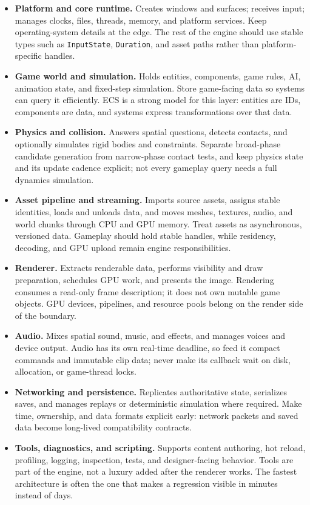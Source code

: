 \documentclass[
  11pt,
  letterpaper,
  DIV=11,
  numbers=noendperiod,
  twoside,
  open=right]{scrreprt}
\begin{document}
\begin{itemize}
\item
  \textbf{Platform and core runtime.} Creates windows and surfaces;
  receives input; manages clocks, files, threads, memory, and platform
  services. Keep operating-system details at the edge. The rest of the
  engine should use stable types such as \texttt{InputState},
  \texttt{Duration}, and asset paths rather than platform-specific
  handles.
\item
  \textbf{Game world and simulation.} Holds entities, components, game
  rules, AI, animation state, and fixed-step simulation. Store
  game-facing data so systems can query it efficiently. ECS is a strong
  model for this layer: entities are IDs, components are data, and
  systems express transformations over that data.
\item
  \textbf{Physics and collision.} Answers spatial questions, detects
  contacts, and optionally simulates rigid bodies and constraints.
  Separate broad-phase candidate generation from narrow-phase contact
  tests, and keep physics state and its update cadence explicit; not
  every gameplay query needs a full dynamics simulation.
\item
  \textbf{Asset pipeline and streaming.} Imports source assets, assigns
  stable identities, loads and unloads data, and moves meshes, textures,
  audio, and world chunks through CPU and GPU memory. Treat assets as
  asynchronous, versioned data. Gameplay should hold stable handles,
  while residency, decoding, and GPU upload remain engine
  responsibilities.
\item
  \textbf{Renderer.} Extracts renderable data, performs visibility and
  draw preparation, schedules GPU work, and presents the image.
  Rendering consumes a read-only frame description; it does not own
  mutable game objects. GPU devices, pipelines, and resource pools
  belong on the render side of the boundary.
\item
  \textbf{Audio.} Mixes spatial sound, music, and effects, and manages
  voices and device output. Audio has its own real-time deadline, so
  feed it compact commands and immutable clip data; never make its
  callback wait on disk, allocation, or game-thread locks.
\item
  \textbf{Networking and persistence.} Replicates authoritative state,
  serializes saves, and manages replays or deterministic simulation
  where required. Make time, ownership, and data formats explicit early:
  network packets and saved data become long-lived compatibility
  contracts.
\item
  \textbf{Tools, diagnostics, and scripting.} Supports content
  authoring, hot reload, profiling, logging, inspection, tests, and
  designer-facing behavior. Tools are part of the engine, not a luxury
  added after the renderer works. The fastest architecture is often the
  one that makes a regression visible in minutes instead of days.
\end{itemize}
\end{document}

